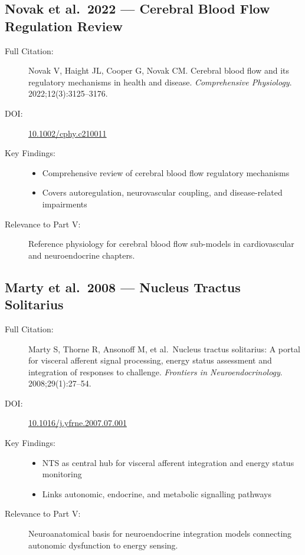 \subsection{Novak et al.\ 2022 --- Cerebral Blood Flow Regulation Review}

\begin{description}
    \item[Full Citation:] Novak V, Haight JL, Cooper G, Novak CM. Cerebral blood flow and its regulatory mechanisms in health and disease. \textit{Comprehensive Physiology}. 2022;12(3):3125--3176. \cite{Novak2022CBFReview}
    \item[DOI:] \href{https://doi.org/10.1002/cphy.c210011}{10.1002/cphy.c210011}
    \item[Key Findings:]
    \begin{itemize}
        \item Comprehensive review of cerebral blood flow regulatory mechanisms
        \item Covers autoregulation, neurovascular coupling, and disease-related impairments
    \end{itemize}
    \item[Relevance to Part V:] Reference physiology for cerebral blood flow sub-models in cardiovascular and neuroendocrine chapters.
\end{description}

\subsection{Marty et al.\ 2008 --- Nucleus Tractus Solitarius}

\begin{description}
    \item[Full Citation:] Marty S, Thorne R, Ansonoff M, et al.\ Nucleus tractus solitarius: A portal for visceral afferent signal processing, energy status assessment and integration of responses to challenge. \textit{Frontiers in Neuroendocrinology}. 2008;29(1):27--54. \cite{Marty2008NTS}
    \item[DOI:] \href{https://doi.org/10.1016/j.yfrne.2007.07.001}{10.1016/j.yfrne.2007.07.001}
    \item[Key Findings:]
    \begin{itemize}
        \item NTS as central hub for visceral afferent integration and energy status monitoring
        \item Links autonomic, endocrine, and metabolic signalling pathways
    \end{itemize}
    \item[Relevance to Part V:] Neuroanatomical basis for neuroendocrine integration models connecting autonomic dysfunction to energy sensing.
\end{description}

